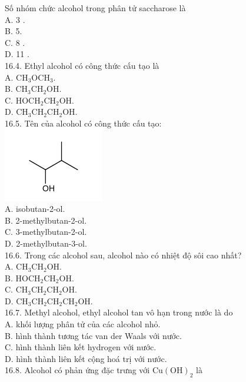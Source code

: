 \documentclass[10pt]{article}
\begin{document}
Số nhóm chức alcohol trong phân tử saccharose là\\
A. 3 .\\
B. 5.\\
C. 8 .\\
D. 11 .\\
16.4. Ethyl alcohol có công thức cấu tạo là\\
A. $\mathrm{CH}_{3} \mathrm{OCH}_{3}$.\\
B. $\mathrm{CH}_{3} \mathrm{CH}_{2} \mathrm{OH}$.\\
C. $\mathrm{HOCH}_{2} \mathrm{CH}_{2} \mathrm{OH}$.\\
D. $\mathrm{CH}_{3} \mathrm{CH}_{2} \mathrm{CH}_{2} \mathrm{OH}$.\\
16.5. Tên của alcohol có công thức cấu tạo:\\
\includegraphics{smile-cc90d5d96ebacb9f626df2436683b45d0384f0da}\\
A. isobutan-2-ol.\\
B. 2-methylbutan-2-ol.\\
C. 3-methylbutan-2-ol.\\
D. 2-methylbutan-3-ol.\\
16.6. Trong các alcohol sau, alcohol nào có nhiệt độ sôi cao nhất?\\
A. $\mathrm{CH}_{3} \mathrm{CH}_{2} \mathrm{OH}$.\\
B. $\mathrm{HOCH}_{2} \mathrm{CH}_{2} \mathrm{OH}$.\\
C. $\mathrm{CH}_{3} \mathrm{CH}_{2} \mathrm{CH}_{2} \mathrm{OH}$.\\
D. $\mathrm{CH}_{3} \mathrm{CH}_{2} \mathrm{CH}_{2} \mathrm{CH}_{2} \mathrm{OH}$.\\
16.7. Methyl alcohol, ethyl alcohol tan vô hạn trong nước là do\\
A. khối lượng phân tử của các alcohol nhỏ.\\
B. hình thành tương tác van der Waals với nước.\\
C. hình thành liên kết hydrogen với nước.\\
D. hình thành liên kết cộng hoá trị với nước.\\
16.8. Alcohol có phản ứng đặc trưng với $\mathrm{Cu}(\mathrm{OH})_{2}$ là\\
\end{document}
